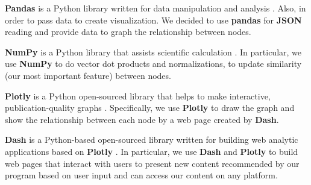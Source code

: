 \documentclass[fontsize=11pt]{article}
\begin{document}
\begin{enumerate}
    \quad \textbf{Pandas} is a Python library written for data manipulation and analysis \citep{Pan21}. Also, in order to pass data to create visualization. We decided to use \textbf{pandas} for \textbf{JSON} reading and provide data to graph the relationship between nodes.
    
    \quad \textbf{NumPy} is a Python library that assists scientific calculation \citep{Pynpy}. In particular, we use \textbf{NumPy} to do vector dot products and normalizations, to update similarity (our most important feature) between nodes.
    
    \quad \textbf{Plotly} is a Python open-sourced library that helps to make interactive, publication-quality graphs \citep{plotly}. Specifically, we use \textbf{Plotly} to draw the graph and show the relationship between each node by a web page created by \textbf{Dash}.
    
    \quad \textbf{Dash} is a Python-based open-sourced library written for building web analytic applications based on \textbf{Plotly} \citep{Dash21}. In particular, we use \textbf{Dash} and \textbf{Plotly} to build web pages that interact with users to present new content recommended by our program based on user input and can access our content on any platform.
    
\end{enumerate}



\end{document}
